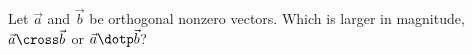 \documentclass{ximera}
\begin{document}
\begin{problem}
  Let $\vec{a}$ and $\vec{b}$ be orthogonal nonzero vectors. Which is
  larger in magnitude, $\vec{a}\cross\vec{b}$ or $\vec{a}\dotp\vec{b}$?
  \begin{prompt}
    \begin{multipleChoice}
    \end{multipleChoice}
  \end{prompt}
\end{problem}
\end{document}
